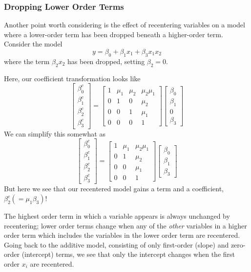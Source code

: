 \documentclass[]{article}
\begin{document}
\subsubsection{Dropping Lower Order
Terms}\label{dropping-lower-order-terms}

Another point worth considering is the effect of recentering variables
on a model where a lower-order term has been dropped beneath a
higher-order term. Consider the model
\[y = \beta_0 + \beta_1x_1 + \beta_3x_1x_2\] where the term
\(\beta_2x_2\) has been dropped, setting \(\beta_2=0\).

Here, our coefficient transformation looks like
\[\begin{bmatrix}\beta_0^c \\ \beta_1^c \\ \beta_2^c \\ \beta_3^c \end{bmatrix}=
\begin{bmatrix} 1 & \mu_1 &\mu_2 &\mu_2\mu_1 \\
  0 &1 &0 &\mu_2 \\ 0 &0 &1 &\mu_1 \\ 0 &0 &0 &1 \end{bmatrix}
\begin{bmatrix}\beta_0 \\ \beta_1 \\ 0 \\ \beta_3 \end{bmatrix}\] We can
simplify this somewhat as
\[\begin{bmatrix}\beta_0^c \\ \beta_1^c \\ \beta_2^c \\ \beta_3^c \end{bmatrix}=
\begin{bmatrix} 1 & \mu_1 &\mu_2\mu_1 \\
  0 &1 &\mu_2 \\ 0 &0 &\mu_1 \\ 0 &0 &1 \end{bmatrix}
\begin{bmatrix}\beta_0 \\ \beta_1 \\ \beta_3 \end{bmatrix}\] But here we
see that our recentered model gains a term and a coefficient,
\(\beta_2^c (=\mu_1\beta_3)\)!

The highest order term in which a variable appears is always unchanged
by recentering; lower order terms change when any of the \emph{other}
variables in a higher order term which includes the variables in the
lower order term are recentered. Going back to the additive model,
consisting of only first-order (slope) and zero-order (intercept) terms,
we see that only the intercept changes when the first order \(x_i\) are
recentered.
\end{document}

